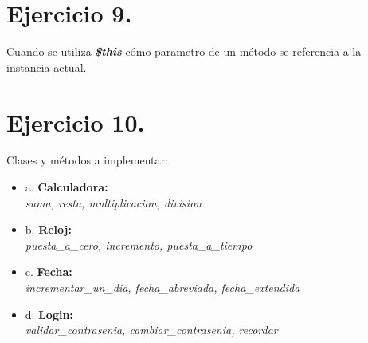\documentclass{article}
\begin{document}
\section*{Ejercicio 9.}

Cuando se utiliza \textit{\textbf{\$this}} cómo parametro de un método se referencia
a la instancia actual.

\section*{Ejercicio 10.}

Clases y métodos a implementar:
\begin{itemize}
    \item a. \textbf{Calculadora:} \\\textit{suma, resta, multiplicacion, division}
    \item b. \textbf{Reloj:} \\\textit{puesta\_a\_cero, incremento, puesta\_a\_tiempo}
    \item c. \textbf{Fecha:} \\\textit{incrementar\_un\_dia, fecha\_abreviada, fecha\_extendida}
    \item d. \textbf{Login:} \\\textit{validar\_contrasenia, cambiar\_contrasenia, recordar}
\end{itemize}
\end{document}
